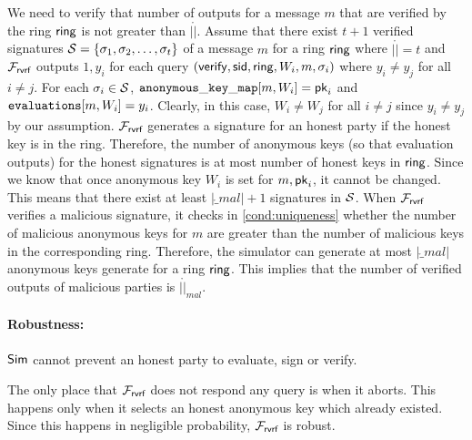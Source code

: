 We need to verify that number of outputs for a message $ m $ that are verified by the ring $ \mathsf{ring} $ is not greater than $ |\ring| $.
Assume that there exist $ t + 1 $ verified signatures $ {\mathcal{S}} = \{\sigma_1, \sigma_2, \ldots, \sigma_t\} $ of a message $ m $ for a ring $ \mathsf{ring} $ where $ |\ring| = t $ and $ \mathcal{F}_{\textsf{rvrf}} $ outputs $ 1, y_i $ for each query $ (\mathsf{verify}, \textsf{sid}, \mathsf{ring}, W_i, m, \sigma_i) $ where $ y_i \neq y_j $ for all $ i \neq j $. For each $ \sigma_i \in {\ensuremath{\mathcal{S}}} $, $ \mathtt{anonymous\_key\_map}[m,W_i] = \mathsf{pk}_i $ and $\texttt{evaluations}[m,W_i] = y_i $. Clearly, in this case, $ W_i \neq W_j $ for all $ i \neq j $ since $ y_i \neq y_j $ by our assumption. $ \mathcal{F}_{\textsf{rvrf}} $ generates a signature for an honest party if the honest key is in the ring. Therefore, the number of anonymous keys (so that evaluation outputs) for the honest signatures is at most number of honest keys in $ \mathsf{ring} $. Since we know that once anonymous key $ W_i $ is set for $ m, \mathsf{pk}_i $, it cannot be changed. This means that there exist at least $ |\ring_{mal}| + 1 $ signatures in $ {\mathcal{S}} $. When $ \mathcal{F}_{\textsf{rvrf}} $ verifies a malicious signature, it checks in \ref{cond:uniqueness} whether the number of malicious anonymous keys for $ m $ are greater than the number of malicious keys in the corresponding ring. Therefore, the simulator can generate at most $ |\ring_{mal}| $ anonymous keys generate for a ring $ \mathsf{ring} $. This implies that the number of verified outputs of malicious parties   is $ |\ring|_{mal} $. 

\paragraph{Robustness:} $ \mathsf{Sim} $ cannot prevent an honest party to evaluate, sign or verify.

The only place that $ \mathcal{F}_{\textsf{rvrf}} $ does not respond any query is when it aborts. This happens only when it selects an honest anonymous key which already existed. Since this happens in negligible probability,  $ \mathcal{F}_{\textsf{rvrf}} $ is robust.

